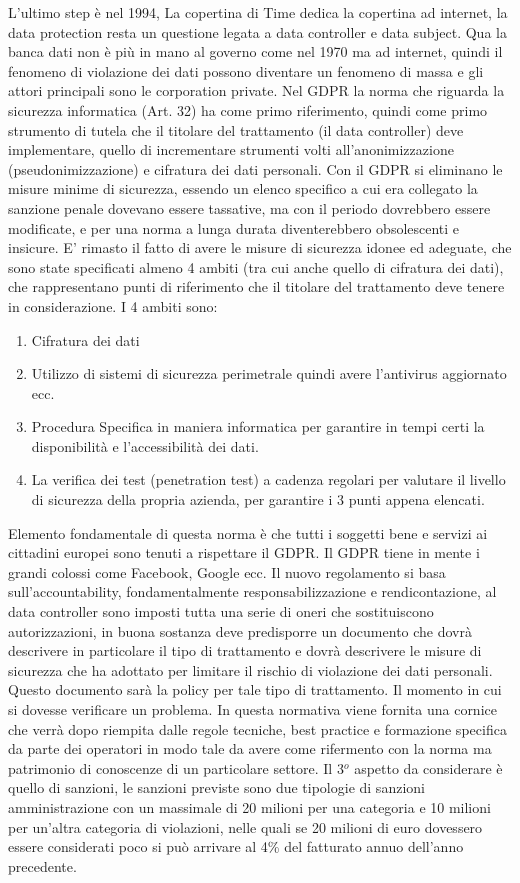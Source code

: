 \documentclass[a4page, 11pt, twocolumn]{article}
\begin{document}
L’ultimo step è nel 1994, La copertina di Time dedica la copertina ad internet, la data protection resta un questione legata a data controller e data subject. Qua la banca dati non è più in mano al governo come nel 1970 ma ad internet, quindi il fenomeno di violazione dei dati possono diventare un fenomeno di massa e gli attori principali sono le corporation private. \newline
Nel GDPR la norma che riguarda la sicurezza informatica (Art. 32) ha come primo riferimento, quindi come primo strumento di tutela che il titolare del trattamento (il data controller) deve implementare, quello di incrementare strumenti volti all’anonimizzazione (pseudonimizzazione) e cifratura dei dati personali. Con il GDPR si eliminano le misure minime di sicurezza, essendo un elenco specifico a cui era collegato la sanzione penale dovevano essere tassative, ma con il periodo dovrebbero essere modificate, e per una norma a lunga durata diventerebbero obsolescenti e insicure. E’ rimasto il fatto di avere le misure di sicurezza idonee ed adeguate, che sono state specificati almeno 4 ambiti (tra cui anche quello di cifratura dei dati), che rappresentano punti di riferimento che il titolare del trattamento deve tenere in considerazione. I 4 ambiti sono:
\begin{enumerate}
	\item Cifratura dei dati
	\item Utilizzo di sistemi di sicurezza perimetrale quindi avere l’antivirus aggiornato ecc.
	\item Procedura Specifica in maniera informatica per garantire in tempi certi la disponibilità e l'accessibilità dei dati.
	\item La verifica dei test (penetration test) a cadenza regolari per valutare il livello di sicurezza della propria azienda, per garantire i 3 punti appena elencati.
\end{enumerate}
Elemento fondamentale di questa norma è che tutti i soggetti bene e servizi ai cittadini europei sono tenuti a rispettare il GDPR. Il GDPR tiene in mente i grandi colossi come Facebook, Google ecc. Il nuovo regolamento si basa sull’accountability, fondamentalmente responsabilizzazione e rendicontazione, al data controller sono imposti tutta una serie di oneri che sostituiscono autorizzazioni, in buona sostanza deve predisporre un documento che dovrà descrivere in particolare il tipo di trattamento e dovrà descrivere le misure di sicurezza che ha adottato per limitare il rischio di violazione dei dati personali. Questo documento sarà la policy per tale tipo di trattamento. Il momento in cui si dovesse verificare un problema. In questa normativa viene fornita una cornice che verrà dopo riempita dalle regole tecniche, best practice e formazione specifica da parte dei operatori in modo tale da avere come rifermento con la norma ma patrimonio di conoscenze di un particolare settore. Il 3$^o$ aspetto da considerare è quello di sanzioni, le sanzioni previste sono due tipologie di sanzioni amministrazione con un massimale di 20 milioni per una categoria e 10 milioni per un’altra categoria di violazioni, nelle quali se 20 milioni di euro dovessero essere considerati poco si può arrivare al 4\% del fatturato annuo dell’anno precedente. \newline
\end{document}
